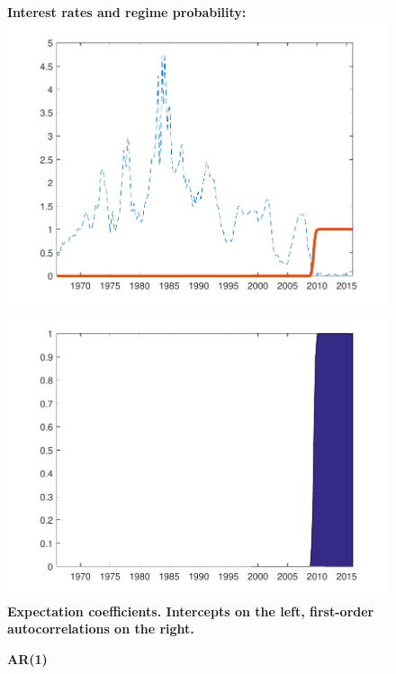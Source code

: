 \documentclass[12pt,reqno]{article}
\numberwithin{equation}{section}
\begin{document}
\begin{figure}[H]
\caption{\large{\textbf{AR(1)}}}
\vspace{5 mm}

\textbf{Interest rates and regime probability:} \\

\includegraphics[scale=0.6]{NKPC_optim_init_AR1_regime.pdf}
\includegraphics[scale=0.6]{NKPC_optim_init_AR1_regimeProb.pdf}\\

\textbf{Expectation coefficients. Intercepts on the left, first-order autocorrelations on the right.}\\


\end{figure}
\end{document}
